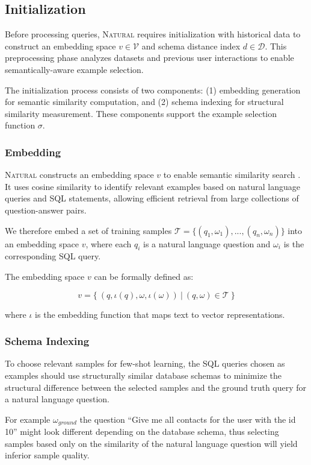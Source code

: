 \subsection{Initialization}

Before processing queries, \textsc{Natural} requires initialization
with historical data to construct an embedding space $v \in \mathcal{V}$ and
schema distance index $d \in \mathcal{D}$. This preprocessing phase analyzes
datasets and previous user interactions to enable semantically-aware example selection.

The initialization process consists of two components: (1) embedding generation
for semantic similarity computation, and (2) schema indexing for structural similarity
measurement. These components support the example selection function $\sigma$.

\subsubsection{Embedding}\label{design:embedding}

\textsc{Natural} constructs an embedding space $v$ to enable semantic similarity search
\citep{DAIL-SQL}. It uses cosine similarity to identify relevant examples based
on natural language queries and SQL statements, allowing efficient retrieval from
large collections of question-answer pairs.

We therefore embed a set of training samples $\mathcal{T} = \{(q_1, \omega_1), ..., (q_n, \omega_n)\}$
into an embedding space $v$, where each $q_i$ is a natural language question and $\omega_i$
is the corresponding SQL query.

The embedding space $v$ can be formally defined as:

$$v = \{~(q, \iota(q), \omega, \iota(\omega))~|~(q, \omega) \in \mathcal{T}~\}$$

where $\iota$ is the embedding function that maps text to vector representations.

\subsubsection{Schema Indexing}

To choose relevant samples for few-shot learning,
the SQL queries chosen as examples should use
structurally similar database schemas to minimize the structural
difference between the selected samples and the ground truth query for a
natural language question.

For example $\omega_{ground}$ the question ``Give me all contacts for the user with the id 10''
might look different depending on the database schema, thus selecting
samples based only on the similarity of the natural language question will yield inferior
sample quality.

